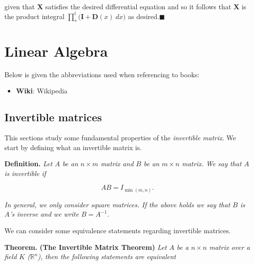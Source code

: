 \documentclass[a4paper,10pt,openany]{book}
\providecommand{\tightlist}{%
 \setlength{\itemsep}{0pt}\setlength{\parskip}{0pt}}
\begin{document}
given that \(\mathbf{X}\) satisfies the desired differential equation and so it follows that \(\mathbf{X}\) is the product integral \(\prod_{s}^t\big(\mathbf{I}+\mathbf{D}(x)\ dx\big)\) as desired.\(\blacksquare\)

\hypertarget{linear-algebra}{%
\chapter{Linear Algebra}\label{linear-algebra}}

Below is given the abbreviations used when referencing to books:

\begin{itemize}
\tightlist
\item
  \textbf{Wiki}: Wikipedia
\end{itemize}

\hypertarget{invertible-matrices}{%
\section{Invertible matrices}\label{invertible-matrices}}

This sections study some fundamental properties of the \emph{invertible matrix}. We start by defining what an invertible matrix is.

\textbf{Definition.} \emph{Let \(A\) be an \(n\times m\) matrix and \(B\) be an \(m\times n\) matrix. We say that \(A\) is invertible if}

\[
AB=I_{\min(m,n)}.
\]

\emph{In general, we only consider square matrices. If the above holds we say that \(B\) is \(A\)'s inverse and we write \(B=A^{-1}\).}

We can consider some equivalence statements regarding invertible matrices.

\textbf{Theorem.} \textbf{(The Invertible Matrix Theorem)} \emph{Let \(A\) be a \(n\times n\) matrix over a field \(K\) (\(\mathbb{R}^n\)), then the following statements are equivalent}
\end{document}
